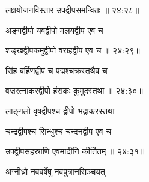 
{\devanagarifont लक्षयोजनविस्तार उपद्वीपसमन्वितः {॥ २४:२८॥} \veg\dontdisplaylinenum }%

{\devanagarifont अङ्गद्वीपो यवद्वीपो मलयद्वीप एव च \thinspace{\dandab} \dontdisplaylinenum }%


{\devanagarifont शङ्खद्वीपकमुद्वीपो वराहद्वीप एव च {॥ २४:२९॥} \veg\dontdisplaylinenum }%

{\devanagarifont सिंह बर्हिणद्वीपं च पद्मश्चक्रस्तथैव च \thinspace{\dandab} \dontdisplaylinenum }%


{\devanagarifont वज्ररत्नाकरद्वीपो हंसकः कुमुदस्तथा {॥ २४:३०॥} \veg\dontdisplaylinenum }%
 
{\devanagarifont लाङ्गलो वृषद्वीपश्च द्वीपो भद्राकरस्तथा \thinspace{\dandab} \dontdisplaylinenum }%

{\devanagarifont चन्द्रद्वीपश्च सिन्धुश्च चन्दनद्वीप एव च  \danda\dontdisplaylinenum }%


{\devanagarifont उपद्वीपसहस्राणि एवमादीनि कीर्तितम् {॥ २४:३१॥} \veg\dontdisplaylinenum }%


{\devanagarifont अग्नीध्रो नववर्षेषु नवपुत्रानसिञ्चयत् \thinspace{\dandab} \dontdisplaylinenum }%

